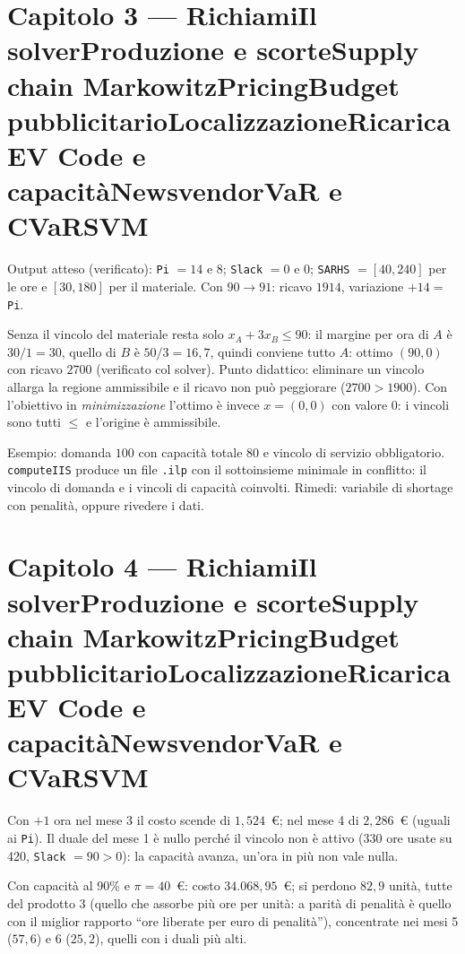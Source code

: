 \documentclass[11pt,a4paper]{article}
\newcounter{cap}
\newcounter{sol}[cap]
\newcommand{\capitolo}[1]{\setcounter{cap}{#1}\section*{Capitolo #1 --- \capnome{#1}}}
\newcommand{\capnome}[1]{%
  \ifcase#1\or\or Richiami\or Il solver\or Produzione e scorte\or Supply chain\or
  Markowitz\or Pricing\or Budget pubblicitario\or Localizzazione\or Ricarica EV\or
  Code e capacità\or Newsvendor\or VaR e CVaR\or SVM\fi}
\begin{document}
\capitolo{3}

\begin{soluzione}
Output atteso (verificato): \texttt{Pi} $= 14$ e $8$; \texttt{Slack} $= 0$ e $0$;
\texttt{SARHS} $= [40, 240]$ per le ore e $[30, 180]$ per il materiale. Con
$90 \to 91$: ricavo $1914$, variazione $+14 = $ \texttt{Pi}.
\end{soluzione}

\begin{soluzione}
Senza il vincolo del materiale resta solo $x_A + 3x_B \le 90$: il margine per ora
di $A$ è $30/1 = 30$, quello di $B$ è $50/3 = 16{,}7$, quindi conviene tutto $A$:
ottimo $(90, 0)$ con ricavo $2700$ (verificato col solver). Punto didattico:
eliminare un vincolo allarga la regione ammissibile e il ricavo non può peggiorare
($2700 > 1900$). Con l'obiettivo in \emph{minimizzazione} l'ottimo è invece
$x = (0,0)$ con valore $0$: i vincoli sono tutti $\le$ e l'origine è ammissibile.
\end{soluzione}

\begin{soluzione}
Esempio: domanda $100$ con capacità totale $80$ e vincolo di servizio obbligatorio.
\texttt{computeIIS} produce un file \texttt{.ilp} con il sottoinsieme minimale in
conflitto: il vincolo di domanda e i vincoli di capacità coinvolti. Rimedi: variabile
di shortage con penalità, oppure rivedere i dati.
\end{soluzione}

\capitolo{4}

\begin{soluzione}[verifica]
Con $+1$ ora nel mese 3 il costo scende di $1{,}524$~\euro; nel mese 4 di
$2{,}286$~\euro{} (uguali ai \texttt{Pi}). Il duale del mese 1 è nullo perché il
vincolo non è attivo (330 ore usate su 420, \texttt{Slack} $= 90 > 0$): la capacità
avanza, un'ora in più non vale nulla.
\end{soluzione}

\begin{soluzione}
Con capacità al 90\% e $\pi = 40$~\euro: costo $34.068{,}95$~\euro; si perdono
$82{,}9$ unità, tutte del prodotto 3 (quello che assorbe più ore per unità: a parità di
penalità è quello con il miglior rapporto ``ore liberate per euro di penalità''),
concentrate nei mesi 5 ($57{,}6$) e 6 ($25{,}2$), quelli con i duali più alti.
\end{soluzione}
\end{document}
